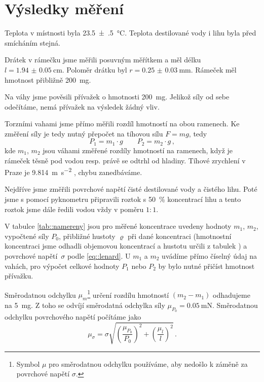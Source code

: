\section*{Výsledky měření}
Teplota v místnosti byla \SI{23.5(5)}{\degreeCelsius}.
Teplota destilované vody i lihu byla před smícháním stejná.

Drátek v rámečku jsme měřili posuvným měřítkem a měl délku $l = \SI{1.94(5)}{\cm}$.
Poloměr drátku byl $r = \SI{0.25(3)}{\milli\metre}$.
Rámeček měl hmotnost přibližně \SI{200}{\milli\g}.

Na váhy jsme pověsili přívažek o hmotnosti \SI{200}{\milli\g}.
Jelikož síly od sebe odečítáme, nemá přívažek na výsledek žádný vliv.

Torzními vahami jsme přímo měřili rozdíl hmotností na obou ramenech.
Ke změření síly je tedy nutný přepočet na tíhovou sílu $F = mg$, tedy
\begin{equation}
P_1 = m_1 \cdot g \qquad P_2= m_2 \cdot g \,,
\end{equation}
kde $m_1$, $m_2$ jsou váhami změřené rozdíly hmotností na ramenech, když je rámeček těsně pod vodou resp. právě se odtrhl od hladiny.
Tíhové zrychlení v Praze je \SI{9,814}{\m\per\s\squared} \cite{gravitace}, chybu zanedbáváme.

Nejdříve jsme změřili povrchové napětí čisté destilované vody a čistého lihu.
Poté jsme s pomocí pyknometru připravili roztok s \SI{50}{\percent} koncentrací lihu a tento roztok jsme dále ředili vodou vždy v poměru $1:1$.

V tabulce \ref{tab::namereny} jsou pro měřené koncentrace uvedeny hodnoty $m_1$, $m_2$, vypočtené síly $P_0$, přibližné hustoty $\varrho$ při dané koncentraci (hmotnostní koncentraci jsme odhadli objemovou koncentrací a hustotu určili z tabulek \cite{hustota}) a povrchové napětí~$\sigma$ podle \eqref{eq::lenard}.
U $m_1$ a $m_2$ uvádíme přímo číselný údaj na vahách, pro výpočet celkové hodnoty $P_1$ nebo $P_2$ by bylo nutné přičíst hmotnost přívažku.

Směrodatnou odchylku $\mu_m$\footnote{Symbol $\mu$ pro směrodatnou odchylku používáme, aby nedošlo k záměně za povrchové napětí $\sigma$.} určení rozdílu hmotností $(m_2-m_1)$ odhadujeme na \SI{5}{\milli \g}.
Z toho se odvíjí směrodatná odchylka síly $\mu_{P_0} = \SI{0.05}{\milli \newton}$.
Směrodatnou odchylku povrchového napětí počítáme jako
\begin{equation}
\mu_\sigma = \sigma \sqrt{ \left(  \frac{\mu_{P_0}}{P_0} \right)^2 +
\left(  \frac{\mu_{l}}{l} \right)^2   } \,.
\end{equation}

